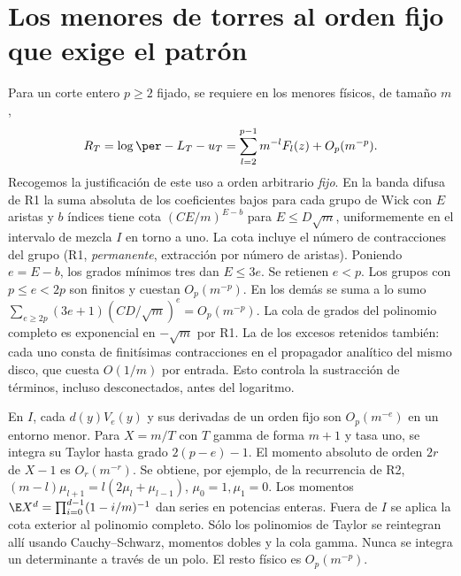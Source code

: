 \section{Los menores de torres al orden fijo que exige el patrón}
Para un corte entero $p\ge2$ fijado, se requiere en los menores físicos, de tamaño $m$,
\[
 R_T=\log\per-L_T-u_T=\sum_{l=2}^{p-1}m^{-l}F_l(z)+O_p(m^{-p}) .
\]
Recogemos la justificación de este uso a orden arbitrario \emph{fijo}.
En la banda difusa de R1 la suma absoluta de los coeficientes bajos para cada grupo de
Wick con $E$ aristas y $b$ índices tiene cota $(CE/m)^{E-b}$ para $E\le D\sqrt m$,
uniformemente en el intervalo de mezcla $I$ en torno a uno. La cota incluye el número
de contracciones del grupo (R1, \emph{permanente}, extracción por número de aristas).
Poniendo $e=E-b$, los grados mínimos tres dan $E\le3e$. Se retienen $e<p$.
Los grupos con $p\le e<2p$ son finitos y cuestan $O_p(m^{-p})$.
En los demás se suma a lo sumo
$\sum_{e\ge2p}(3e+1)(CD/\sqrt m)^e=O_p(m^{-p})$.
La cola de grados del polinomio completo es exponencial en $-\sqrt m$ por R1.
La de los excesos retenidos también: cada uno consta de finitísimas contracciones
en el propagador analítico del mismo disco, que cuesta $O(1/m)$ por entrada.
Esto controla la sustracción de términos, incluso desconectados, antes del logaritmo.

En $I$, cada $d(y)V_e(y)$ y sus derivadas de un orden fijo son $O_p(m^{-e})$ en un
entorno menor. Para $X=m/T$ con $T$ gamma de forma $m+1$ y tasa uno, se integra su
Taylor hasta grado $2(p-e)-1$. El momento absoluto de orden $2r$ de $X-1$ es
$O_r(m^{-r})$. Se obtiene, por ejemplo, de la recurrencia de R2,
$(m-l)\mu_{l+1}=l(2\mu_l+\mu_{l-1})$, $\mu_0=1,\mu_1=0$.
Los momentos $\E X^d=\prod_{i=0}^{d-1}(1-i/m)^{-1}$ dan series en potencias enteras.
Fuera de $I$ se aplica la cota exterior al polinomio completo. Sólo los polinomios
de Taylor se reintegran allí usando Cauchy--Schwarz, momentos dobles y la cola gamma.
Nunca se integra un determinante a través de un polo. El resto físico es $O_p(m^{-p})$.


